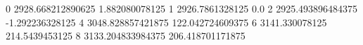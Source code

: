 0 2928.668212890625 1.882080078125
1 2926.7861328125 0.0
2 2925.493896484375 -1.292236328125
4 3048.828857421875 122.042724609375
6 3141.330078125 214.5439453125
8 3133.204833984375 206.418701171875
